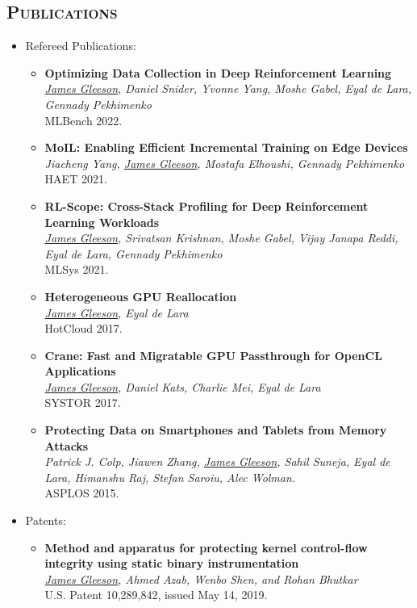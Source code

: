 \documentclass[letterpaper,11pt]{article}
\newcommand{\BulletZeroLeftMargin}{1.5em}
\newcommand{\heading}[1]{%
    \textsc{\textbf{#1}}
}
\newcommand*\resheading[1]{\subsection{\heading{#1}}\vspace{0.3em}\nopagebreak[4]}
\newcommand{\resitem}[1]{\item #1 \vspace{-2pt}}
\newcommand{\ressubheadingnodate}[1]{#1:}
\begin{document}
\resheading{Publications}
\begin{itemize}[leftmargin=\BulletZeroLeftMargin]
\item

	\ressubheadingnodate{Refereed Publications}
    \begin{itemize}[leftmargin=\BulletZeroLeftMargin]
        \resitem{
            \textbf{Optimizing Data Collection in Deep Reinforcement Learning} \\
            \textit{\underline{James Gleeson}, Daniel Snider, Yvonne Yang, Moshe Gabel, Eyal de Lara, Gennady Pekhimenko} \\
            MLBench 2022.
        }
        \resitem{
            \textbf{MoIL: Enabling Efficient Incremental Training on Edge Devices} \\
            \textit{Jiacheng Yang, \underline{James Gleeson}, Mostafa Elhoushi, Gennady Pekhimenko} \\
            HAET 2021.
        }
        \resitem{
            \textbf{RL-Scope: Cross-Stack Profiling for Deep Reinforcement Learning Workloads} \\
            \textit{\underline{James Gleeson}, Srivatsan Krishnan, Moshe Gabel, Vijay Janapa Reddi, Eyal de Lara, Gennady Pekhimenko} \\
            MLSys 2021.
        }
        \resitem{
            \textbf{Heterogeneous GPU Reallocation} \\
            \textit{\underline{James Gleeson}, Eyal de Lara} \\
            HotCloud 2017.
        }
        \resitem{
            \textbf{Crane: Fast and Migratable GPU Passthrough for OpenCL Applications} \\
            \textit{\underline{James Gleeson}, Daniel Kats, Charlie Mei, Eyal de Lara} \\
            SYSTOR 2017.
        }
		\resitem{
            \textbf{Protecting Data on Smartphones and Tablets from Memory Attacks} \\
            \textit{Patrick J. Colp, Jiawen Zhang, \underline{James Gleeson}, Sahil Suneja, Eyal de Lara, Himanshu Raj, Stefan Saroiu, Alec Wolman.} \\
            ASPLOS 2015.
        }
	\end{itemize}
    \item
	\ressubheadingnodate{Patents}
    \begin{itemize}[leftmargin=\BulletZeroLeftMargin]
        \resitem{
            \textbf{Method and apparatus for protecting kernel control-flow integrity using static binary instrumentation} \\
            \textit{\underline{James Gleeson}, Ahmed Azab, Wenbo Shen, and Rohan Bhutkar} \\
            U.S. Patent 10,289,842, issued May 14, 2019.
        }
	\end{itemize}

\end{itemize}
\end{document}

